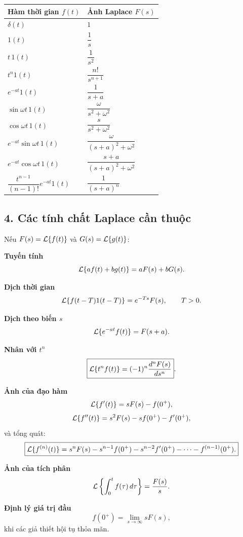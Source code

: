 \begin{center}
\small
\renewcommand{\arraystretch}{1.35}
\begin{tabular}{|p{}|p{}|}
\hline
\textbf{Hàm thời gian $f(t)$} & \textbf{Ảnh Laplace $F(s)$}\\
\hline
$\delta(t)$ & $1$\\
\hline
$1(t)$ & $\dfrac{1}{s}$\\
\hline
$t\,1(t)$ & $\dfrac{1}{s^2}$\\
\hline
$t^n1(t)$ & $\dfrac{n!}{s^{n+1}}$\\
\hline
$e^{-at}1(t)$ & $\dfrac{1}{s+a}$\\
\hline
$\sin \omega t\,1(t)$ & $\dfrac{\omega}{s^2+\omega^2}$\\
\hline
$\cos \omega t\,1(t)$ & $\dfrac{s}{s^2+\omega^2}$\\
\hline
$e^{-at}\sin\omega t\,1(t)$ & $\dfrac{\omega}{(s+a)^2+\omega^2}$\\
\hline
$e^{-at}\cos\omega t\,1(t)$ & $\dfrac{s+a}{(s+a)^2+\omega^2}$\\
\hline
$\dfrac{t^{n-1}}{(n-1)!}e^{-at}1(t)$ & $\dfrac{1}{(s+a)^n}$\\
\hline
\end{tabular}
\renewcommand{\arraystretch}{1}
\end{center}

\subsection*{4. Các tính chất Laplace cần thuộc}

Nếu $F(s)=\mathcal{L}\{f(t)\}$ và $G(s)=\mathcal{L}\{g(t)\}$:

\textbf{Tuyến tính}
\[
\mathcal{L}\{af(t)+bg(t)\}=aF(s)+bG(s).
\]

\textbf{Dịch thời gian}
\[
\mathcal{L}\{f(t-T)1(t-T)\}=e^{-Ts}F(s),\qquad T>0.
\]

\textbf{Dịch theo biến $s$}
\[
\mathcal{L}\{e^{-at}f(t)\}=F(s+a).
\]

\textbf{Nhân với $t^n$}
\[
\boxed{\mathcal{L}\{t^nf(t)\}=(-1)^n\frac{d^nF(s)}{ds^n}}.
\]

\textbf{Ảnh của đạo hàm}
\[
\mathcal{L}\{f'(t)\}=sF(s)-f(0^+),
\]
\[
\mathcal{L}\{f''(t)\}=s^2F(s)-sf(0^+)-f'(0^+),
\]
và tổng quát:
\[
\boxed{
\mathcal{L}\{f^{(n)}(t)\}
=s^nF(s)-s^{n-1}f(0^+)-s^{n-2}f'(0^+)-\cdots-f^{(n-1)}(0^+).
}
\]

\textbf{Ảnh của tích phân}
\[
\mathcal{L}\left\{\int_0^t f(\tau)\,d\tau\right\}=\frac{F(s)}{s}.
\]

\textbf{Định lý giá trị đầu}
\[
f(0^+)=\lim_{s\to\infty}sF(s),
\]
khi các giả thiết hội tụ thỏa mãn.

